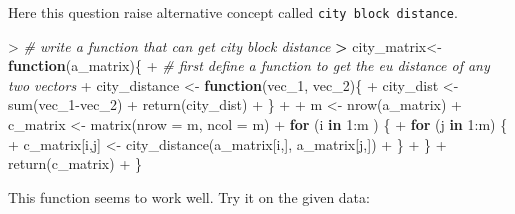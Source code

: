 \documentclass[
]{article}
\newenvironment{Shaded}{\begin{snugshade}}{\end{snugshade}}
\newcommand{\AttributeTok}[1]{\textcolor[rgb]{0.77,0.63,0.00}{#1}}
\newcommand{\CommentTok}[1]{\textcolor[rgb]{0.56,0.35,0.01}{\textit{#1}}}
\newcommand{\ControlFlowTok}[1]{\textcolor[rgb]{0.13,0.29,0.53}{\textbf{#1}}}
\newcommand{\DecValTok}[1]{\textcolor[rgb]{0.00,0.00,0.81}{#1}}
\newcommand{\ErrorTok}[1]{\textcolor[rgb]{0.64,0.00,0.00}{\textbf{#1}}}
\newcommand{\FunctionTok}[1]{\textcolor[rgb]{0.00,0.00,0.00}{#1}}
\newcommand{\NormalTok}[1]{#1}
\newcommand{\OtherTok}[1]{\textcolor[rgb]{0.56,0.35,0.01}{#1}}
\newcommand{\SpecialCharTok}[1]{\textcolor[rgb]{0.00,0.00,0.00}{#1}}
\begin{document}
Here this question raise alternative concept called
\texttt{city\ block\ distance}.

\begin{Shaded}
\begin{Highlighting}[]
\SpecialCharTok{\textgreater{}} \CommentTok{\# write a function that can get city block distance}
\ErrorTok{\textgreater{}}\NormalTok{ city\_matrix}\OtherTok{\textless{}{-}}\ControlFlowTok{function}\NormalTok{(a\_matrix)\{}
\SpecialCharTok{+}   \CommentTok{\# first define a function to get the eu distance of any two vectors}
\SpecialCharTok{+}\NormalTok{   city\_distance }\OtherTok{\textless{}{-}} \ControlFlowTok{function}\NormalTok{(vec\_1, vec\_2)\{}
\SpecialCharTok{+}\NormalTok{     city\_dist }\OtherTok{\textless{}{-}} \FunctionTok{sum}\NormalTok{(vec\_1}\SpecialCharTok{{-}}\NormalTok{vec\_2)}
\SpecialCharTok{+}     \FunctionTok{return}\NormalTok{(city\_dist)}
\SpecialCharTok{+}\NormalTok{     \}}
\SpecialCharTok{+}   
\SpecialCharTok{+}\NormalTok{   m }\OtherTok{\textless{}{-}} \FunctionTok{nrow}\NormalTok{(a\_matrix)}
\SpecialCharTok{+}\NormalTok{   c\_matrix }\OtherTok{\textless{}{-}} \FunctionTok{matrix}\NormalTok{(}\AttributeTok{nrow =}\NormalTok{ m, }\AttributeTok{ncol =}\NormalTok{ m)}
\SpecialCharTok{+}   \ControlFlowTok{for}\NormalTok{ (i }\ControlFlowTok{in} \DecValTok{1}\SpecialCharTok{:}\NormalTok{m ) \{}
\SpecialCharTok{+}     \ControlFlowTok{for}\NormalTok{ (j }\ControlFlowTok{in} \DecValTok{1}\SpecialCharTok{:}\NormalTok{m) \{}
\SpecialCharTok{+}\NormalTok{       c\_matrix[i,j] }\OtherTok{\textless{}{-}} \FunctionTok{city\_distance}\NormalTok{(a\_matrix[i,], a\_matrix[j,])}
\SpecialCharTok{+}\NormalTok{     \}}
\SpecialCharTok{+}\NormalTok{   \}}
\SpecialCharTok{+}   \FunctionTok{return}\NormalTok{(c\_matrix)}
\SpecialCharTok{+}\NormalTok{ \}}
\end{Highlighting}
\end{Shaded}

This function seems to work well. Try it on the given data:
\end{document}
